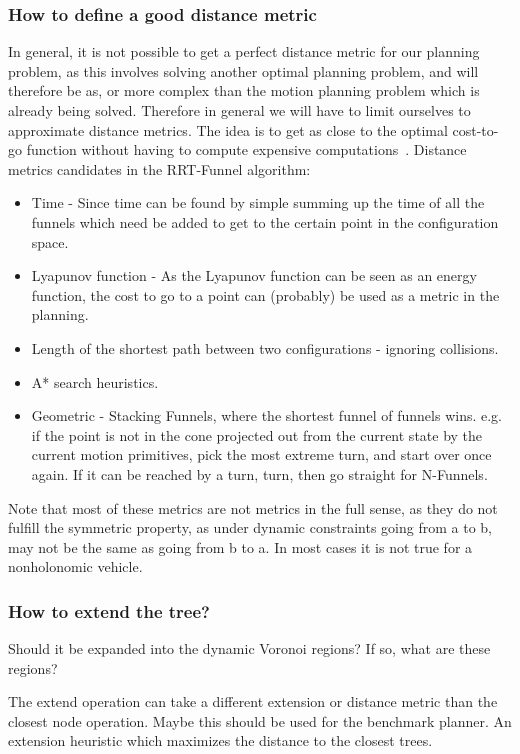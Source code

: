 \subsubsection{How to define a good distance metric}
In general, it is not possible to get a perfect distance metric for our planning
problem, as this involves solving another optimal planning problem, and will
therefore be as, or more complex than the motion planning problem which is
already being solved. Therefore in general we will have to limit ourselves to
approximate distance metrics. The idea is to get as close to the optimal
cost-to-go function without having to compute expensive
computations~\cite{Lav06}. Distance metrics candidates in the RRT-Funnel
algorithm:
\begin{itemize}
\item Time - Since time can be found by simple summing up the time of all the
  funnels which need be added to get to the certain point in the configuration
  space.
\item Lyapunov function - As the Lyapunov function can be seen as an energy
  function, the cost to go to a point can (probably) be used as a metric in the
  planning.
\item Length of the shortest path between two configurations - ignoring
  collisions.
\item A* search heuristics.
\item Geometric - Stacking Funnels, where the shortest funnel of funnels wins.
  e.g. if the point is not in the cone projected out from the current state by
  the current motion primitives, pick the most extreme turn, and start over once
  again. If it can be reached by a turn, turn, then go straight for N-Funnels.
\end{itemize}

Note that most of these metrics are not metrics in the full sense, as they do
not fulfill the symmetric property, as under dynamic constraints going from a to
b, may not be the same as going from b to a. In most cases it is not true for a
nonholonomic vehicle.

\subsubsection{How to extend the tree?}

Should it be expanded into the dynamic Voronoi regions? If so, what are these
regions?

The extend operation can take a different extension or distance metric than the
closest node operation. Maybe this should be used for the benchmark planner. An
extension heuristic which maximizes the distance to the closest trees.

